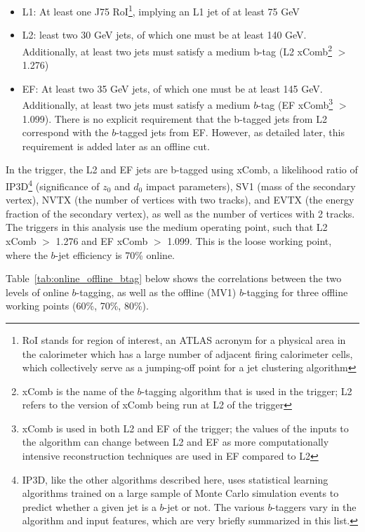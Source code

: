 \begin{itemize}
    \item L1: At least one J75 RoI\footnote{RoI stands for region of interest, an ATLAS acronym
    for a physical area in the calorimeter which has a large number of adjacent firing calorimeter
    cells, which collectively serve as a jumping-off point for a jet clustering algorithm}, implying an L1 jet of at least 75 GeV
    \item L2: least two 30 GeV jets, of which one must be at least 140 GeV. Additionally, at least two
jets must satisfy a medium b-tag (L2 xComb\footnote{xComb is the name of the $b$-tagging algorithm
that is used in the trigger; L2 refers to the version of xComb being run at L2 of the trigger} $>$ 1.276)
    \item EF: At least two 35 GeV jets, of which one must be at least 145 GeV. Additionally, at least two
jets must satisfy a medium $b$-tag (EF xComb\footnote{xComb is used in both L2 and EF of the trigger;
the values of the inputs to the algorithm can change between L2 and EF as more computationally intensive
reconstruction techniques are used in EF compared to L2} $>$ 1.099). There is no explicit requirement that the
b-tagged jets from L2 correspond with the $b$-tagged jets from EF. However, as detailed later, this
requirement is added later as an offline cut.
\end{itemize}


In the trigger, the L2 and EF jets are b-tagged using xComb, a likelihood ratio of IP3D\footnote{IP3D, like
the other algorithms described here, uses statistical learning algorithms trained on a large sample
of Monte Carlo simulation events to predict whether a given jet is a $b$-jet or not.  The various $b$-taggers
vary in the algorithm and input features, which are very briefly summarized in this list. } 
(significance of $z_0$ and $d_0$ impact parameters), SV1 (mass of the secondary vertex), NVTX (the number of
vertices with two tracks), and EVTX (the energy fraction of the secondary vertex), as well as the number
of vertices with 2 tracks. The triggers in this analysis use the medium operating point, such that L2 xComb
$>$ 1.276 and EF xComb $>$ 1.099.  This is the loose working point, where the $b$-jet efficiency
is 70\% online.

Table~\ref{tab:online_offline_btag} below shows the correlations between the two levels of online
$b$-tagging, as well as the offline (MV1) $b$-tagging for three offline working points (60\%, 70\%,
80\%).  


